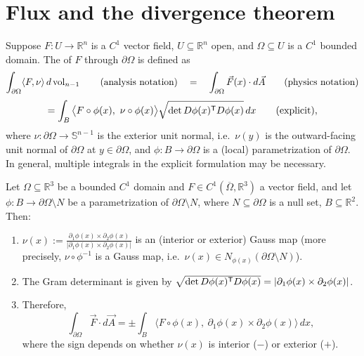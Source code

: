 
\section{Flux and the divergence theorem}
\label{sec:flux_divergence_theorem}

\begin{definition}[Flux]
\label{def:flux}
Suppose $F : U \to \mathbb{R}^n$ is a $C^1$ vector field, $U \subseteq \mathbb{R}^n$ open, and
$\Omega \subseteq U$ is a $C^1$ bounded domain. The   of $F$
through $\partial\Omega$ is defined as
\[\int_{\partial\Omega} \langle F,\nu\rangle\,d\operatorname{vol}_{n-1} \qquad \text{(analysis notation)}
  \quad = \quad \int_{\partial\Omega} \vec F(x)\cdot d\vec A \qquad \text{(physics notation)}\]
\[= \int_B \big\langle F\circ\phi(x),\ \nu\circ\phi(x)\big\rangle
   \sqrt{\det D\phi(x)^{\mathsf{T}} D\phi(x)}\,dx \qquad \text{(explicit)},\]
where $\nu : \partial\Omega \to \mathbb{S}^{n-1}$ is the exterior unit normal, i.e.\ $\nu(y)$
is the outward-facing unit normal of $\partial\Omega$ at $y \in \partial\Omega$, and
$\phi : B \to \partial\Omega$ is a (local) parametrization of $\partial\Omega$. In general,
multiple integrals in the explicit formulation may be necessary.
\end{definition}

\begin{proposition}
\label{prop:flux_r3}
Let $\Omega \subseteq \mathbb{R}^3$ be a bounded $C^1$ domain and $F \in
C^1(\overline\Omega,\mathbb{R}^3)$ a vector field, and let $\phi : B \to \partial\Omega
\setminus N$ be a parametrization of $\partial\Omega\setminus N$, where $N \subseteq
\partial\Omega$ is a null set, $B \subseteq \mathbb{R}^2$. Then:
\begin{enumerate}[label=\textbf{(\alph*)}]
  \item $\displaystyle\nu(x) := \frac{\partial_1\phi(x)\times\partial_2\phi(x)}
    {\lvert\partial_1\phi(x)\times\partial_2\phi(x)\rvert}$ is an (interior or exterior) Gauss
    map (more precisely, $\nu\circ\phi^{-1}$ is a Gauss map, i.e.\
    $\nu(x) \in N_{\phi(x)}(\partial\Omega\setminus N)$).
  \item The Gram determinant is given by
    $\sqrt{\det D\phi(x)^{\mathsf{T}} D\phi(x)} = \lvert\partial_1\phi(x)\times\partial_2\phi(x)
    \rvert$.
  \item Therefore,
    \[\int_{\partial\Omega} \vec F\cdot d\vec A = \pm\int_B \big\langle F\circ\phi(x),\
      \partial_1\phi(x)\times\partial_2\phi(x)\big\rangle\,dx,\]
    where the sign depends on whether $\nu(x)$ is interior ($-$) or exterior ($+$).
\end{enumerate}
\end{proposition}

